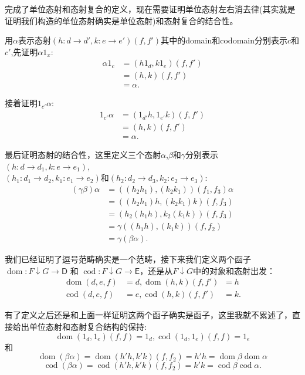 \documentclass{article}
\newcommand{\sD}{\mathsf{D}}
\newcommand{\sE}{\mathsf{E}}
\newcommand{\al}{\alpha}
\newcommand{\be}{\beta}
\newcommand{\gm}{\gamma}
\newcommand*{\xfunc}[4]{{#2}\colon{#3}{#1}{#4}}
\newcommand*{\func}[3]{\xfunc{\to}{#1}{#2}{#3}}
\newcommand*{\qty}[1]{\left({#1}\right)}
\DeclareMathOperator{\dom}{dom}
\DeclareMathOperator{\cod}{cod}
\begin{document}
完成了单位态射和态射复合的定义，现在需要证明单位态射左右消去律(其实就是证明我们构造的单位态射确实是单位态射)和态射复合的结合性。

用$\al$表示态射$\qty{\func{h}{d}{d'},\func{k}{e}{e'}} \qty{f,f'}$其中的domain和codomain分别表示$c$和$c'$,先证明$\al 1_x$:
\begin{align*}
	\al  1_{c } &= \qty{h 1_{d},k 1_{e}}\qty{f,f'}\\
	&= \qty{h,k}\qty{f,f'} \\
	 &= \al.
\end{align*}

接着证明$1_{c'}\al$:
\begin{align*}
	1_{c' } \al &= \qty{1_{d'} h, 1_{e'} k}\qty{f,f'}\\
	&= \qty{h,k}\qty{f,f'}\\
	&= \al.
\end{align*}

最后证明态射的结合性，这里定义三个态射$\al$,$\be$和$\gm$分别表示$\qty{\func{h}{d}{d_1},\func{k}{e}{e_1}}$,\\$\qty{\func{h_1}{d_1}{d_2},\func{k_1}{e_1}{e_2}}$和$\qty{\func{h_2}{d_2}{d_3},\func{k_2}{e_2}{e_3}}$:
\begin{align*}
	(\gm\be)\al&=((h_2h_1),(k_2 k_1))(f_1,f_3) \al\\
	&=((h_2 h_1) h,(k_2 k_1) k)(f,f_3)\\
	&=(h_2(h_1 h),k_2(k_1 k))(f,f_3)\\
	&=\gm((h_1 h),(k_1 k))(f,f_2)\\
	&=\gm(\be \al).
\end{align*}

我们已经证明了逗号范畴确实是一个范畴，接下来我们定义两个函子$\func{\dom}{F \downarrow G}{\sD}$ 和 $\func{\cod}{F \downarrow G}{\sE}$，还是从$F \downarrow G$中的对象和态射出发：
\begin{align*}
	\dom\qty{d,e,f} &= d, \dom\qty{h,k}\qty{f,f'} \;\;= h \\
	\cod\qty{d,e,f} &= e, \cod\qty{h,k}\qty{f,f'} \quad= k.
\end{align*}

有了定义之后还是和上面一样证明这两个函子确实是函子，这里我就不累述了，直接给出单位态射和态射复合结构的保持:\[\dom\qty{1_{d},1_{e}}\qty{f,f} = 1_d,\cod\qty{1_{d},1_{e}}\qty{f,f} =1_e \]和\[\dom(\be \al) = \dom\qty{h'  h,k'  k}\qty{f,f_2} =h'
	 h = \dom\be  \dom\al\] \[\cod(\be \al) = \cod \qty{h' h,k' k}\qty{f,f_2}=  k'
	 k = \cod\be\cod\al.\]
	 
\end{document}
